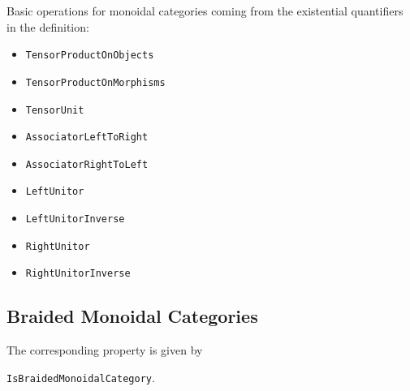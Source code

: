Basic operations for monoidal categories coming from the existential quantifiers
in the definition:
\begin{itemize}
 \item \texttt{TensorProductOnObjects}
 \item \texttt{TensorProductOnMorphisms}
 \item \texttt{TensorUnit}
 \item \texttt{AssociatorLeftToRight}
 \item \texttt{AssociatorRightToLeft}
 \item \texttt{LeftUnitor}
 \item \texttt{LeftUnitorInverse}
 \item \texttt{RightUnitor}
 \item \texttt{RightUnitorInverse}
 
\end{itemize}


\subsection{Braided Monoidal Categories}

\begin{documentation}
 The corresponding \GAP property is given by
 \begin{center}
  \texttt{IsBraidedMonoidalCategory}.  
 \end{center}
\end{documentation}

